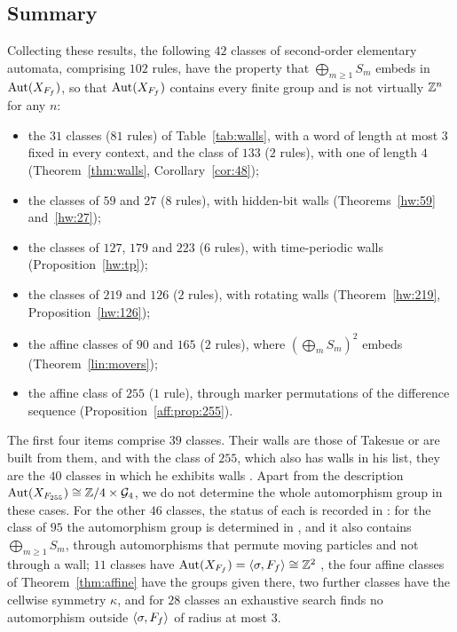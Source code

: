 \subsection*{Summary}
Collecting these results, the following $42$ classes of second-order elementary automata, comprising $102$ rules, have the property that $\bigoplus_{m\ge1}S_m$ embeds in $\operatorname{Aut}(X_{F_f})$, so that $\operatorname{Aut}(X_{F_f})$ contains every finite group and is not virtually $\mathbb{Z}^n$ for any $n$:
\begin{itemize}
\item the $31$ classes ($81$ rules) of Table~\ref{tab:walls}, with a word of length at most $3$ fixed in every context, and the class of $133$ ($2$ rules), with one of length $4$ (Theorem~\ref{thm:walls}, Corollary~\ref{cor:48});
\item the classes of $59$ and $27$ ($8$ rules), with hidden-bit walls (Theorems~\ref{hw:59} and~\ref{hw:27});
\item the classes of $127$, $179$ and $223$ ($6$ rules), with time-periodic walls (Proposition~\ref{hw:tp});
\item the classes of $219$ and $126$ ($2$ rules), with rotating walls (Theorem~\ref{hw:219}, Proposition~\ref{hw:126});
\item the affine classes of $90$ and $165$ ($2$ rules), where $(\bigoplus_mS_m)^2$ embeds (Theorem~\ref{lin:movers});
\item the affine class of $255$ ($1$ rule), through marker permutations of the difference sequence (Proposition~\ref{aff:prop:255}).
\end{itemize}
The first four items comprise $39$ classes. Their walls are those of Takesue or are built from them, and with the class of $255$, which also has walls in his list, they are the $40$ classes in which he exhibits walls \cite[Section~4]{Takesue1989}.
Apart from the description $\operatorname{Aut}(X_{F_{255}})\cong\mathbb{Z}/4\times\mathcal G_4$, we do not determine the whole automorphism group in these cases. For the other $46$ classes, the status of each is recorded in \cite{PaperD}: for the class of $95$ the automorphism group is determined in \cite{PaperE}, and it also contains $\bigoplus_{m\ge1}S_m$, through automorphisms that permute moving particles and not through a wall; $11$ classes have $\operatorname{Aut}(X_{F_f})=\langle\sigma,F_f\rangle\cong\mathbb{Z}^2$ \cite{PaperA,PaperB,PaperE}, the four affine classes of Theorem~\ref{thm:affine} have the groups given there, two further classes have the cellwise symmetry $\kappa$, and for $28$ classes an exhaustive search finds no automorphism outside $\langle\sigma,F_f\rangle$ of radius at most $3$.

